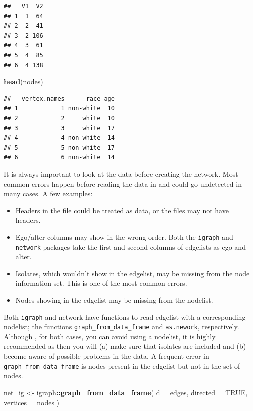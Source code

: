 \documentclass[]{book}
\newenvironment{Shaded}{\begin{snugshade}}{\end{snugshade}}
\newcommand{\DataTypeTok}[1]{\textcolor[rgb]{0.13,0.29,0.53}{#1}}
\newcommand{\KeywordTok}[1]{\textcolor[rgb]{0.13,0.29,0.53}{\textbf{#1}}}
\newcommand{\NormalTok}[1]{#1}
\newcommand{\OperatorTok}[1]{\textcolor[rgb]{0.81,0.36,0.00}{\textbf{#1}}}
\newcommand{\OtherTok}[1]{\textcolor[rgb]{0.56,0.35,0.01}{#1}}
\newcommand{\StringTok}[1]{\textcolor[rgb]{0.31,0.60,0.02}{#1}}
\begin{document}
\begin{verbatim}
##   V1  V2
## 1  1  64
## 2  2  41
## 3  2 106
## 4  3  61
## 5  4  85
## 6  4 138
\end{verbatim}

\begin{Shaded}
\begin{Highlighting}[]
\KeywordTok{head}\NormalTok{(nodes)}
\end{Highlighting}
\end{Shaded}

\begin{verbatim}
##   vertex.names      race age
## 1            1 non-white  10
## 2            2     white  10
## 3            3     white  17
## 4            4 non-white  14
## 5            5 non-white  17
## 6            6 non-white  14
\end{verbatim}

It is always important to look at the data before creating the network. Most common
errors happen before reading the data in and could go undetected in many cases.
A few examples:

\begin{itemize}
\item
  Headers in the file could be treated as data, or the files may not
  have headers.
\item
  Ego/alter columns may show in the wrong order. Both the \texttt{igraph} and \texttt{network}
  packages take the first and second columns of edgelists as ego and alter.
\item
  Isolates, which wouldn't show in the edgelist, may be missing from the node
  information set. This is one of the most common errors.
\item
  Nodes showing in the edgelist may be missing from the nodelist.
\end{itemize}

Both \texttt{igraph} and network have functions to read edgelist with a corresponding
nodelist; the functions \texttt{graph\_from\_data\_frame} and \texttt{as.nework}, respectively. Although
, for both cases, you can avoid using a nodelist, it is highly recommended as then
you will (a) make sure that isolates are included and (b) become aware of possible
problems in the data. A frequent error in \texttt{graph\_from\_data\_frame} is nodes present
in the edgelist but not in the set of nodes.

\begin{Shaded}
\begin{Highlighting}[]
\NormalTok{net_ig <-}\StringTok{ }\NormalTok{igraph}\OperatorTok{::}\KeywordTok{graph_from_data_frame}\NormalTok{(}
  \DataTypeTok{d        =}\NormalTok{ edges,}
  \DataTypeTok{directed =} \OtherTok{TRUE}\NormalTok{,}
  \DataTypeTok{vertices =}\NormalTok{ nodes}
\NormalTok{)}
\end{Highlighting}
\end{Shaded}
\end{document}
